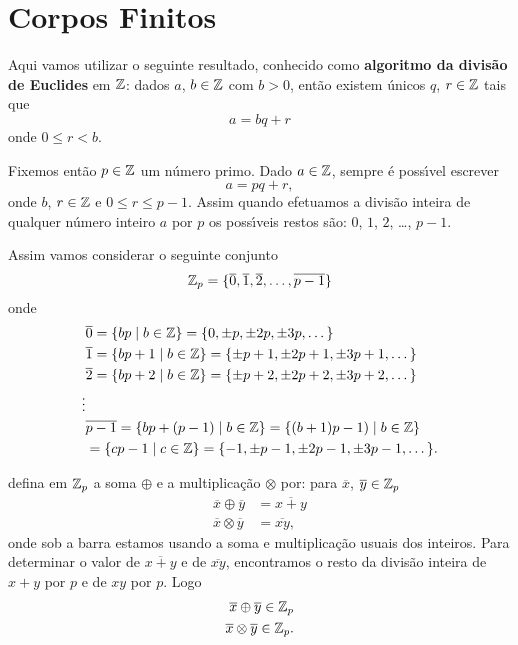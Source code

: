 
\section{Corpos Finitos}\label{sec:corpor_finitos}

Aqui vamos utilizar o seguinte resultado, conhecido como \textbf{algoritmo da divis\~ao de Euclides} em $\mathbb{Z}$: dados $a$, $b \in \mathbb{Z}$ com $b > 0$, ent\~ao existem \'unicos $q$, $r \in \mathbb{Z}$ tais que
\[
	a = bq + r
\]
onde $0 \le r < b$.


Fixemos ent\~ao $p \in \mathbb{Z}$ um n\'umero primo. Dado $a \in \mathbb{Z}$, sempre \'e poss{\'\i}vel escrever
\[
	a = pq + r,
\]
onde $b$, $r \in \mathbb{Z}$ e $0 \le r \le p - 1$. Assim quando efetuamos a divis\~ao inteira de qualquer n\'umero inteiro $a$ por $p$ os poss{\'\i}veis restos s\~ao: $0$,
$1$, $2$, \dots, $p -1 $.

Assim vamos considerar o seguinte conjunto
\[
	\mathbb{Z}_p = \{\overline{0}, \overline{1}, \overline{2}, \dots, \overline{p - 1}\}
\]
onde
\begin{align*}
	&\overline{0} = \{bp \mid b \in \mathbb{Z}\} = \{0, \pm p, \pm 2p, \pm 3p, \dots\}\\
	&\overline{1} = \{bp + 1\mid b \in \mathbb{Z}\} = \{\pm p + 1, \pm 2p + 1, \pm 3p + 1, \dots\}\\
	&\overline{2} = \{bp + 2\mid b \in \mathbb{Z}\} = \{\pm p + 2, \pm 2p + 2, \pm 3p + 2, \dots\}\\
	\vdots\\
	&\overline{p - 1} = \{bp + (p - 1) \mid b \in \mathbb{Z}\} = \{(b + 1)p - 1) \mid b \in \mathbb{Z}\}\\ &= \{cp - 1 \mid c \in \mathbb{Z}\} = \{-1, \pm p - 1, \pm 2p - 1, \pm 3p - 1, \dots\}.
\end{align*}

defina em $\mathbb{Z}_p$ a soma $\oplus$ e a multiplica\c{c}\~ao $\otimes$ por: para $\overline{x}$, $\overline{y} \in \mathbb{Z}_p$
\begin{align*}
	\overline{x} \oplus \overline{y} &= \overline{x + y}\\
	\overline{x} \otimes \overline{y} &= \overline{xy},
\end{align*}
onde sob a barra estamos usando a soma e multiplica\c{c}\~ao usuais dos inteiros. Para determinar o valor de $\overline{x + y}$ e de $\overline{xy}$, encontramos o resto da divis\~ao inteira de $x + y$ por $p$ e de $xy$ por $p$. Logo
\begin{align*}
	\overline{x} \oplus \overline{y} \in \mathbb{Z}_p\\
	\overline{x} \otimes \overline{y} \in \mathbb{Z}_p.
\end{align*}

